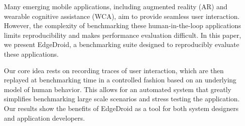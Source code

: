 
Many emerging mobile applications, including augmented reality (AR) and wearable cognitive assistance (WCA), aim to provide seamless user interaction. 
However, the complexity of benchmarking these human-in-the-loop applications limits reproducibility and makes performance evaluation difficult. In this paper, we present EdgeDroid, a benchmarking suite designed to reproducibly evaluate these applications.

Our core idea rests on recording traces of user interaction, which are then replayed at benchmarking time in a controlled fashion based on an underlying model of human behavior. 
This allows for an automated system that greatly simplifies benchmarking large scale scenarios and stress testing the application.
Our results show the benefits of EdgeDroid as a tool for both system designers and application developers.
